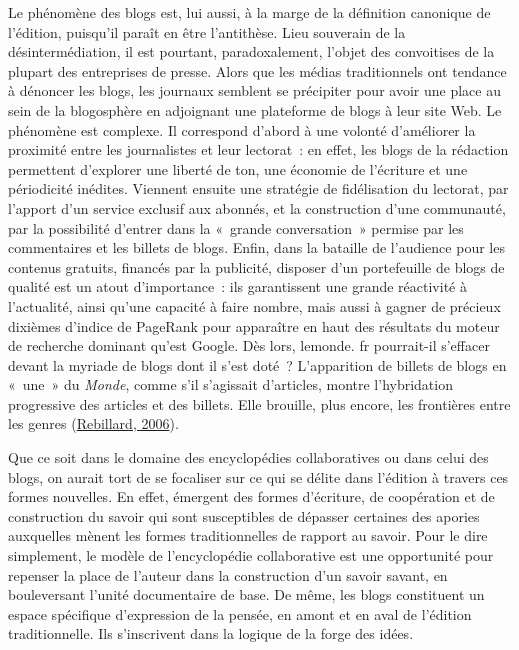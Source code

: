 \documentclass[12pt,french,letterpaper,]{article}
\begin{document}
Le phénomène des blogs est, lui aussi, à la marge de la définition
canonique de l'édition, puisqu'il paraît en être l'antithèse. Lieu
souverain de la désintermédiation, il est pourtant, paradoxalement,
l'objet des convoitises de la plupart des entreprises de presse. Alors
que les médias traditionnels ont tendance à dénoncer les blogs, les
journaux semblent se précipiter pour avoir une place au sein de la
blogosphère en adjoignant une plateforme de blogs à leur site Web. Le
phénomène est complexe. Il correspond d'abord à une volonté d'améliorer
la proximité entre les journalistes et leur lectorat~: en effet, les
blogs de la rédaction permettent d'explorer une liberté de ton, une
économie de l'écriture et une périodicité inédites. Viennent ensuite une
stratégie de fidélisation du lectorat, par l'apport d'un service
exclusif aux abonnés, et la construction d'une communauté, par la
possibilité d'entrer dans la «~grande conversation~» permise par les
commentaires et les billets de blogs. Enfin, dans la bataille de
l'audience pour les contenus gratuits, financés par la publicité,
disposer d'un portefeuille de blogs de qualité est un atout
d'importance~: ils garantissent une grande réactivité à l'actualité,
ainsi qu'une capacité à faire nombre, mais aussi à gagner de précieux
dixièmes d'indice de PageRank pour apparaître en haut des résultats du
moteur de recherche dominant qu'est Google. Dès lors, lemonde. fr
pourrait-il s'effacer devant la myriade de blogs dont il s'est doté~?
L'apparition de billets de blogs en «~une~» du \emph{Monde}, comme s'il
s'agissait d'articles, montre l'hybridation progressive des articles et
des billets. Elle brouille, plus encore, les frontières entre les genres
(\protect\hyperlink{ref-rebillard_information_2006}{Rebillard, 2006}).

Que ce soit dans le domaine des encyclopédies collaboratives ou dans
celui des blogs, on aurait tort de se focaliser sur ce qui se délite
dans l'édition à travers ces formes nouvelles. En effet, émergent des
formes d'écriture, de coopération et de construction du savoir qui sont
susceptibles de dépasser certaines des apories auxquelles mènent les
formes traditionnelles de rapport au savoir. Pour le dire simplement, le
modèle de l'encyclopédie collaborative est une opportunité pour repenser
la place de l'auteur dans la construction d'un savoir savant, en
bouleversant l'unité documentaire de base. De même, les blogs
constituent un espace spécifique d'expression de la pensée, en amont et
en aval de l'édition traditionnelle. Ils s'inscrivent dans la logique de
la forge des idées.
\end{document}
